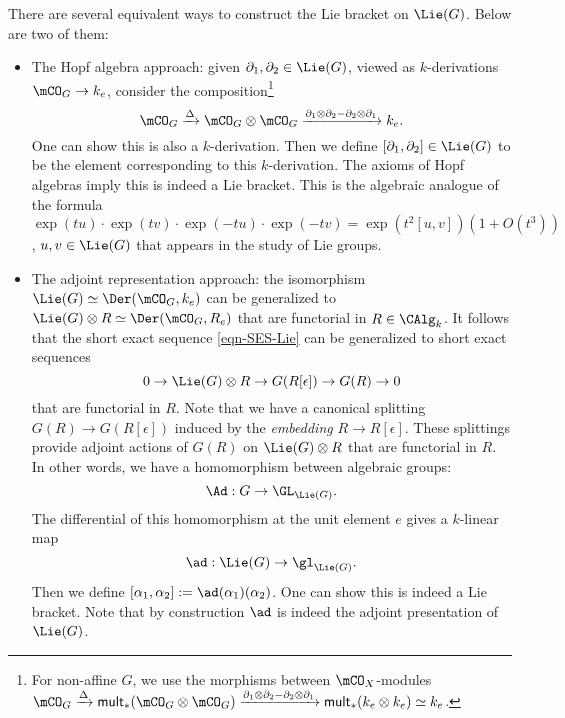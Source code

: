 \begin{rem}
	There are several equivalent ways to construct the Lie bracket on $\Lie(G)$. Below are two of them:
	\begin{itemize}
		\item 
			The Hopf algebra approach: given $\partial_1,\partial_2\in \Lie(G)$, viewed as $k$-derivations $\mCO_G \to k_e$, consider the composition\footnote{For non-affine $G$, we use the morphisms between $\mCO_X$-modules $\mCO_G \xrightarrow{\Delta} \mathsf{mult}_*(\mCO_G \ot \mCO_G) \xrightarrow{ \partial_1 \ot\partial_2 -\partial_2\ot\partial_1 }\mathsf{mult}_*(k_e \ot k_e) \simeq k_e$.}
			\[
				\mCO_G \xrightarrow{\Delta} \mCO_G \ot \mCO_G \xrightarrow{ \partial_1 \ot\partial_2 -\partial_2\ot\partial_1 } k_e.
			\]
			One can show this is also a $k$-derivation. Then we define $[\partial_1, \partial_2]\in \Lie(G)$ to be the element corresponding to this $k$-derivation. The axioms of Hopf algebras imply this is indeed a Lie bracket. This is the algebraic analogue of the formula $\exp(t u)\cdot \exp(t v)\cdot \exp(-t u)\cdot \exp(-t v) = \exp(t^2 [u,v])(1+ O(t^3))$, $u,v\in \Lie(G)$ that appears in the study of Lie groups.

		\item
			The adjoint representation approach: the isomorphism $\Lie(G)\simeq \Der(\mCO_G,k_e)$ can be generalized to $\Lie(G)\ot R\simeq \Der(\mCO_G,R_e)$ that are functorial in $R\in \CAlg_k$. It follows that the short exact sequence \eqref{eqn-SES-Lie} can be generalized to short exact sequences
			\[
				0 \to \Lie(G)\ot R \to G(R[\epsilon]) \to G(R) \to 0
			\]
			that are functorial in $R$. Note that we have a canonical splitting $G(R) \to G(R[\epsilon])$ induced by the \emph{embedding} $R\to R[\epsilon]$. These splittings provide adjoint actions of $ G(R)$ on $\Lie(G)\ot R$ that are functorial in $R$. In other words, we have a homomorphism between algebraic groups:
			\begin{equation}
				\label{eqn-Adjiont-action}
				\Ad: G\to \GL_{\Lie(G)}.
			\end{equation}
			The differential of this homomorphism at the unit element $e$ gives a $k$-linear map
			\[
				\ad: \Lie(G) \to \gl_{\Lie(G)}.
			\]
			Then we define $[\alpha_1,\alpha_2]:= \ad(\alpha_1)(\alpha_2)$. One can show this is indeed a Lie bracket. Note that by construction $\ad$ is indeed the adjoint presentation of $\Lie(G)$.
	\end{itemize}

\end{rem}

